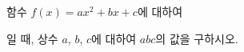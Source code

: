 함수 $f(x)=ax^2+bx+c$에 대하여 \par\smallskip{}\par\smallskip\noindent 일 때, 상수 $a$, $b$, $c$에 대하여 $abc$의 값을 구하시오.
